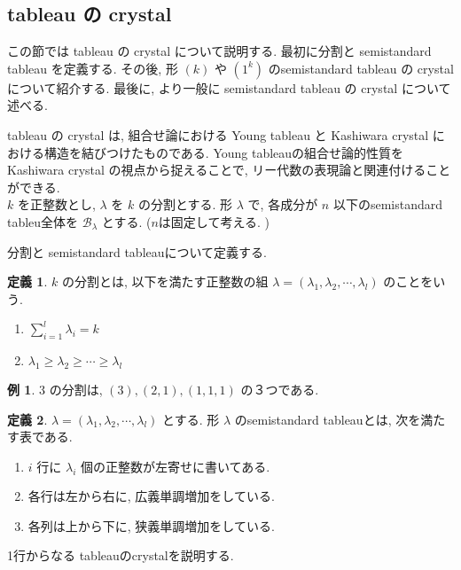 \documentclass[
  a4paper, 
  12pt,
  ja=standard,
  xelatex,
  left=30truemm,
  right=30truemm,
  titlepage 
]{bxjsarticle}
\theoremstyle{definition}
\newtheorem{df}{定義}
\newtheorem*{ex}{例}
\begin{document}
%
\subsection{tableau の crystal}
  この節では tableau の crystal について説明する. 最初に分割と semistandard tableau を定義する. その後, 形 $(k)$ や $(1^k)$ のsemistandard tableau の crystal
  について紹介する. 最後に, より一般に semistandard tableau の crystal について述べる.

  tableau の crystal は, 組合せ論における Young tableau と Kashiwara crystal における構造を結びつけたものである.
  Young tableauの組合せ論的性質を Kashiwara crystal の視点から捉えることで, リー代数の表現論と関連付けることができる.
  \\
  
  $k$ を正整数とし, $\lambda$ を $k$ の分割とする.
  形 $\lambda$ で, 各成分が $n$ 以下のsemistandard tableu全体を $\mathscr{B_\lambda}$ とする. ($n$は固定して考える. )
\bigskip

分割と semistandard tableauについて定義する.

\begin{df}
  $k$ の分割とは, 以下を満たす正整数の組 $\lambda = (\lambda_1, \lambda_2, \cdots, \lambda_l)$ のことをいう.
  \begin{enumerate}
    \item $\sum_{i=1}^l \lambda_i = k $
    \item $\lambda_1\geq \lambda_2 \geq \cdots \geq \lambda_l $
  \end{enumerate}
\end{df}

\begin{ex}
  $3$ の分割は, $(3), (2, 1), (1, 1, 1)$ の３つである.
\end{ex}

\begin{df}
  $\lambda = (\lambda_1, \lambda_2, \cdots, \lambda_l)$ とする. 
  形 $\lambda$ のsemistandard tableauとは, 次を満たす表である.
  \begin{enumerate}
    \item $i$ 行に $\lambda_i$ 個の正整数が左寄せに書いてある.
    \item 各行は左から右に, 広義単調増加をしている. 
    \item 各列は上から下に, 狭義単調増加をしている. 
  \end{enumerate}
\end{df}

1行からなる tableauのcrystalを説明する.
\end{document}
